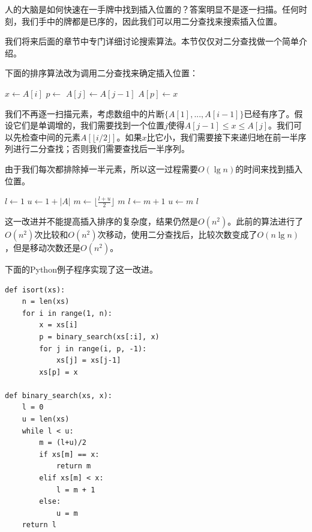 \documentclass[UTF8]{article}
\begin{document}
人的大脑是如何快速在一手牌中找到插入位置的？答案明显不是逐一扫描。任何时刻，我们手中的牌都是已序的，因此我们可以用二分查找来搜索插入位置。

我们将来后面的章节中专门详细讨论搜索算法。本节仅仅对二分查找做一个简单介绍。

下面的排序算法改为调用二分查找来确定插入位置：

\begin{algorithmic}
    \State $x \gets A[i]$
    \State $p \gets $ 
      \State $A[j] \gets A[j-1]$
    \EndFor
    \State $A[p] \gets x$
  \EndFor
\EndFunction
\end{algorithmic}

我们不再逐一扫描元素，考虑数组中的片断$\{A[1], ..., A[i-1] \}$已经有序了。假设它们是单调增的，我们需要找到一个位置$j$使得$A[j-1] \leq x \leq A[j]$。我们可以先检查中间的元素$A[\lfloor i/2 \rfloor]$。如果$x$比它小，我们需要接下来递归地在前一半序列进行二分查找；否则我们需要查找后一半序列。

由于我们每次都排除掉一半元素，所以这一过程需要$O(\lg n)$的时间来找到插入位置。

\begin{algorithmic}
  \State $l \gets 1$
  \State $u \gets 1+|A|$
    \State $m \gets \lfloor \frac{l+u}{2} \rfloor$
      \State \Return $m$ 
      \State $l \gets m+1$
    \Else
      \State $u \gets m$
    \EndIf
  \EndWhile
  \State \Return $l$
\EndFunction
\end{algorithmic}

这一改进并不能提高插入排序的复杂度，结果仍然是$O(n^2)$。此前的算法进行了$O(n^2)$次比较和$O(n^2)$次移动，使用二分查找后，比较次数变成了$O(n \lg n)$，但是移动次数还是$O(n^2)$。

下面的Python例子程序实现了这一改进。

\lstset{language=Python}
\begin{lstlisting}
def isort(xs):
    n = len(xs)
    for i in range(1, n):
        x = xs[i]
        p = binary_search(xs[:i], x)
        for j in range(i, p, -1):
            xs[j] = xs[j-1]
        xs[p] = x

def binary_search(xs, x):
    l = 0
    u = len(xs)
    while l < u:
        m = (l+u)/2
        if xs[m] == x:
            return m
        elif xs[m] < x:
            l = m + 1
        else:
            u = m
    return l
\end{lstlisting}
\end{document}
